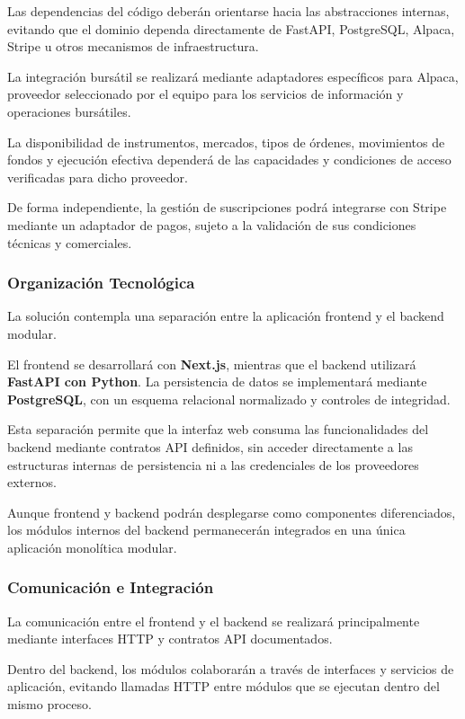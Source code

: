 \documentclass[11pt,a4paper,oneside]{article}
\begin{document}
Las dependencias del código deberán orientarse
hacia las abstracciones internas, evitando que
el dominio dependa directamente de FastAPI,
PostgreSQL, Alpaca, Stripe u otros mecanismos
de infraestructura.

La integración bursátil se realizará mediante
adaptadores específicos para Alpaca, proveedor
seleccionado por el equipo para los servicios
de información y operaciones bursátiles.

La disponibilidad de instrumentos, mercados,
tipos de órdenes, movimientos de fondos y
ejecución efectiva dependerá de las capacidades
y condiciones de acceso verificadas para dicho
proveedor.

De forma independiente, la gestión de suscripciones
podrá integrarse con Stripe mediante un adaptador
de pagos, sujeto a la validación de sus condiciones
técnicas y comerciales.

\subsubsection{Organización Tecnológica}

La solución contempla una separación entre
la aplicación frontend y el backend modular.

El frontend se desarrollará con \textbf{Next.js},
mientras que el backend utilizará \textbf{FastAPI
con Python}. La persistencia de datos se
implementará mediante \textbf{PostgreSQL},
con un esquema relacional normalizado y
controles de integridad.

Esta separación permite que la interfaz web
consuma las funcionalidades del backend
mediante contratos API definidos, sin acceder
directamente a las estructuras internas de
persistencia ni a las credenciales de
los proveedores externos.

Aunque frontend y backend podrán desplegarse
como componentes diferenciados, los módulos
internos del backend permanecerán integrados
en una única aplicación monolítica modular.

\subsubsection{Comunicación e Integración}

La comunicación entre el frontend y el backend
se realizará principalmente mediante interfaces
HTTP y contratos API documentados.

Dentro del backend, los módulos colaborarán
a través de interfaces y servicios de aplicación,
evitando llamadas HTTP entre módulos que
se ejecutan dentro del mismo proceso.
\end{document}
